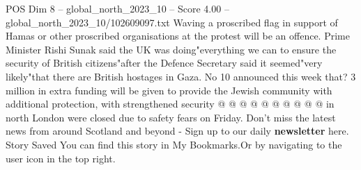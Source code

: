 \begin{textsample}{POS Dim 8 – global\_north\_2023\_10 – Score 4.00 – global\_north\_2023\_10/102609097.txt}
Waving a proscribed flag in support of Hamas or other proscribed organisations at the protest will be an offence.
Prime Minister Rishi Sunak said the UK was doing"everything we can to ensure the security of British citizens"after the Defence Secretary said it seemed"very likely"that there are British hostages in Gaza.
No 10 announced this week that? 3 million in extra funding will be given to provide the Jewish community with additional protection, with strengthened security @ @ @ @ @ @ @ @ @ @ in north London were closed due to safety fears on Friday.
Don't miss the latest news from around Scotland and beyond - Sign up to our daily \textbf{newsletter} here.
Story Saved You can find this story in My Bookmarks.Or by navigating to the user icon in the top right.

\end{textsample}
